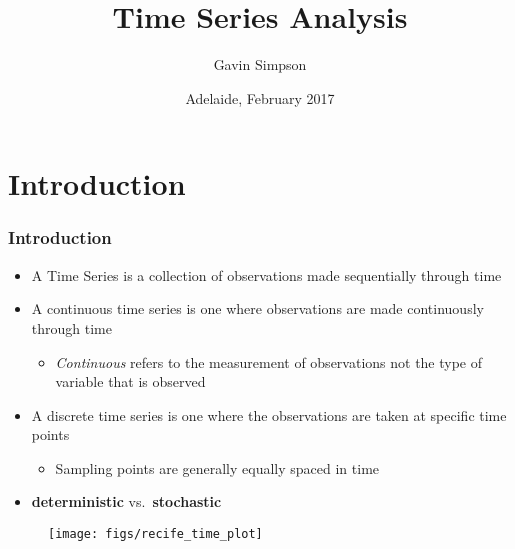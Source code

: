 \documentclass{beamer}
\title[Time Series]{Time Series Analysis}
\author[Gavin Simpson]{Gavin Simpson}
\institute[IECS, URegina]{Institute of Environmental Change and Society \\ University of Regina}
\date{Adelaide, February 2017}
\begin{document}
\begin{frame}
\titlepage
\end{frame}


\section{Introduction}
\begin{frame}
\frametitle{Introduction}
\small
\begin{itemize}
    \item A Time Series is a collection of observations made sequentially through time
    \item A \alert{continuous} time series is one where observations are made continuously through time
    \begin{itemize}
        \item \emph{Continuous} refers to the measurement of observations not the type of variable that is observed
    \end{itemize}
    \item A \alert{discrete} time series is one where the observations are taken at specific time points
    \begin{itemize}
        \item Sampling points are generally equally spaced in time
    \end{itemize}
    \item \textbf{deterministic} vs.~\textbf{stochastic}
\end{itemize}

\begin{figure}
    \centering
    \texttt{[image: figs/recife\_time\_plot]}
\end{figure}
\normalsize
\end{frame}
\end{document}
